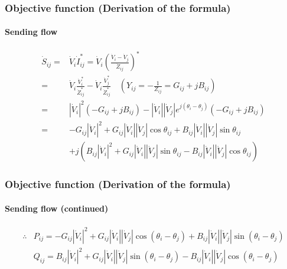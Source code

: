 \documentclass[
	11pt, %
	aspectratio=169, %
]{beamer}
\begin{document}
\begin{frame}
	\frametitle{Objective function (Derivation of the formula)}
	\framesubtitle{Sending flow} %

	\begin{align*}
		\dot{S}_{ij}=&\dot{V}_{i}\dot{I}_{ij}^{*} = \dot{V}_{i}\left( \frac{\dot{V}_{i}-\dot{V}_{j}}{\dot{Z}_{ij}}   \right) ^{*}  \\
		=&\dot{V}_{i}\frac{\dot{V}_{i}^{*}}{\dot{Z}_{ij}^{*}} - \dot{V}_{i}\frac{\dot{V}_{j}^{*}}{\dot{Z}_{ij}^{*}} \quad \left(Y_{ij} =-\frac{1}{Z_{ij}} = G_{ij}+jB_{ij}\right) \\
		=&\left\lvert \dot{V}_{i}\right\rvert^{2} \left(-G_{ij}+jB_{ij}\right) - \left\lvert \dot{V}_{i}\right\rvert\left\lvert \dot{V}_{j}\right\rvert e^{j\left(\theta_{i}-\theta_{j}\right) } \left(-G_{ij}+jB_{ij}\right)\\
		=&-G_{ij}\left\lvert \dot{V}_{i}\right\rvert^{2} + G_{ij}\left\lvert \dot{V}_{i}\right\rvert\left\lvert \dot{V}_{j}\right\rvert \cos{\theta_{ij}} + B_{ij}\left\lvert \dot{V}_{i}\right\rvert\left\lvert \dot{V}_{j}\right\rvert \sin{\theta_{ij}}  \\
		 &+j\left( B_{ij}\left\lvert \dot{V}_{i}\right\rvert^{2} + G_{ij}\left\lvert \dot{V}_{i}\right\rvert\left\lvert \dot{V}_{j}\right\rvert \sin{\theta_{ij}} - B_{ij}\left\lvert \dot{V}_{i}\right\rvert\left\lvert \dot{V}_{j}\right\rvert \cos{\theta_{ij}} \right) 
	\end{align*}


\end{frame}


\begin{frame}
	\frametitle{Objective function (Derivation of the formula)}
	\framesubtitle{Sending flow (continued)} %

	\begin{align*}
	 	\therefore &P_{ij}=-G_{ij}\left\lvert \dot{V}_{i}\right\rvert^{2} + G_{ij}\left\lvert \dot{V}_{i}\right\rvert\left\lvert \dot{V}_{j}\right\rvert \cos{\left(\theta_{i}-\theta_{j}\right)} + B_{ij}\left\lvert \dot{V}_{i}\right\rvert\left\lvert \dot{V}_{j}\right\rvert \sin{\left(\theta_{i}-\theta_{j}\right)}\\
		&Q_{ij}=B_{ij}\left\lvert \dot{V}_{i}\right\rvert^{2} + G_{ij}\left\lvert \dot{V}_{i}\right\rvert\left\lvert \dot{V}_{j}\right\rvert \sin{\left(\theta_{i}-\theta_{j}\right)} - B_{ij}\left\lvert \dot{V}_{i}\right\rvert\left\lvert \dot{V}_{j}\right\rvert \cos{\left(\theta_{i}-\theta_{j}\right)}
	\end{align*}

	
\end{frame}
\end{document}
